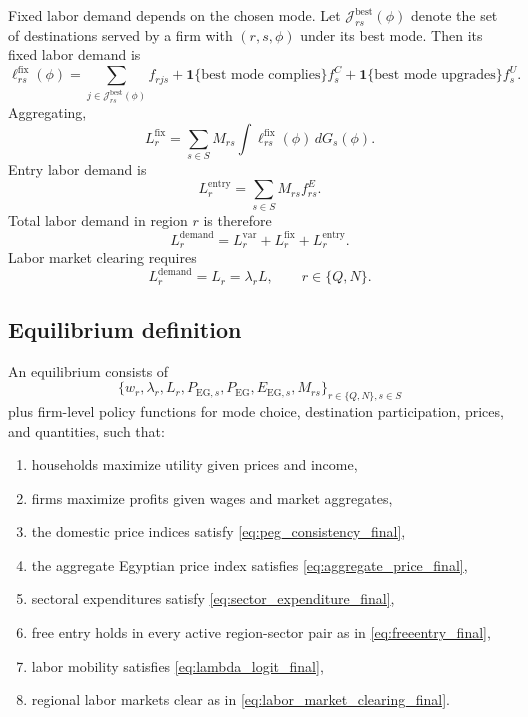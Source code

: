 \documentclass[11pt]{article}
\begin{document}
Fixed labor demand depends on the chosen mode. Let \(\mathcal{J}^{\mathrm{best}}_{rs}(\phi)\) denote the set of destinations served by a firm with \((r,s,\phi)\) under its best mode. Then its fixed labor demand is
\begin{equation}
\ell^{\mathrm{fix}}_{rs}(\phi)=\sum_{j\in\mathcal{J}^{\mathrm{best}}_{rs}(\phi)}f_{rjs}+\mathbf{1}\{\text{best mode complies}\}f_s^C+\mathbf{1}\{\text{best mode upgrades}\}f_s^U.
\end{equation}
Aggregating,
\begin{equation}
L_r^{\mathrm{fix}}=\sum_{s\in S}M_{rs}\int \ell^{\mathrm{fix}}_{rs}(\phi)\,dG_s(\phi).
\end{equation}
Entry labor demand is
\begin{equation}
L_r^{\mathrm{entry}}=\sum_{s\in S}M_{rs}f^E_{rs}.
\end{equation}
Total labor demand in region \(r\) is therefore
\begin{equation}
L_r^{\mathrm{demand}}=L_r^{\mathrm{var}}+L_r^{\mathrm{fix}}+L_r^{\mathrm{entry}}.
\label{eq:labor_demand_region_final}
\end{equation}
Labor market clearing requires
\begin{equation}
L_r^{\mathrm{demand}}=L_r=\lambda_r L, \qquad r\in\{Q,N\}.
\label{eq:labor_market_clearing_final}
\end{equation}

\subsection{Equilibrium definition}

An equilibrium consists of
\begin{equation*}
\{w_r,\lambda_r,L_r,P_{\mathrm{EG},s},P_{\mathrm{EG}},E_{\mathrm{EG},s},M_{rs}\}_{r\in\{Q,N\},s\in S}
\end{equation*}
plus firm-level policy functions for mode choice, destination participation, prices, and quantities, such that:
\begin{enumerate}[leftmargin=*]
    \item households maximize utility given prices and income,
    \item firms maximize profits given wages and market aggregates,
    \item the domestic price indices satisfy \eqref{eq:peg_consistency_final},
    \item the aggregate Egyptian price index satisfies \eqref{eq:aggregate_price_final},
    \item sectoral expenditures satisfy \eqref{eq:sector_expenditure_final},
    \item free entry holds in every active region-sector pair as in \eqref{eq:freeentry_final},
    \item labor mobility satisfies \eqref{eq:lambda_logit_final},
    \item regional labor markets clear as in \eqref{eq:labor_market_clearing_final}.
\end{enumerate}
\end{document}
